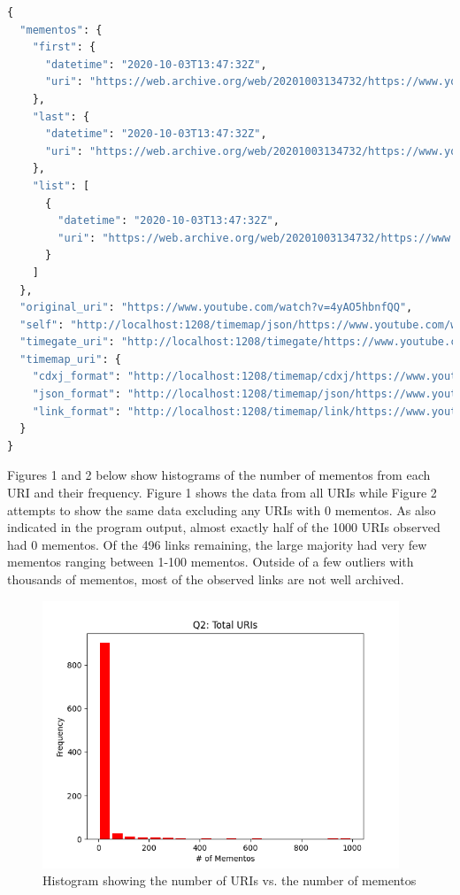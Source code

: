 \documentclass[12pt]{article}
\begin{document}
\begin{lstlisting}[language=Python, caption=TimeMap of first link, label=lst:copy]
{
  "mementos": {
    "first": {
      "datetime": "2020-10-03T13:47:32Z",
      "uri": "https://web.archive.org/web/20201003134732/https://www.youtube.com/watch?v=4yAO5hbnfQQ&gl=US&hl=en"
    },
    "last": {
      "datetime": "2020-10-03T13:47:32Z",
      "uri": "https://web.archive.org/web/20201003134732/https://www.youtube.com/watch?v=4yAO5hbnfQQ&gl=US&hl=en"
    },
    "list": [
      {
        "datetime": "2020-10-03T13:47:32Z",
        "uri": "https://web.archive.org/web/20201003134732/https://www.youtube.com/watch?v=4yAO5hbnfQQ&gl=US&hl=en"
      }
    ]
  },
  "original_uri": "https://www.youtube.com/watch?v=4yAO5hbnfQQ",
  "self": "http://localhost:1208/timemap/json/https://www.youtube.com/watch?v=4yAO5hbnfQQ",
  "timegate_uri": "http://localhost:1208/timegate/https://www.youtube.com/watch?v=4yAO5hbnfQQ",
  "timemap_uri": {
    "cdxj_format": "http://localhost:1208/timemap/cdxj/https://www.youtube.com/watch?v=4yAO5hbnfQQ",
    "json_format": "http://localhost:1208/timemap/json/https://www.youtube.com/watch?v=4yAO5hbnfQQ",
    "link_format": "http://localhost:1208/timemap/link/https://www.youtube.com/watch?v=4yAO5hbnfQQ"
  }
}
\end{lstlisting}


\par Figures 1 and 2 below show histograms of the number of mementos from each URI and their frequency. Figure 1 shows the data from all URIs while Figure 2 attempts to show the same data excluding any URIs with 0 mementos. As also indicated in the program output, almost exactly half of the 1000 URIs observed had 0 mementos. Of the 496 links remaining, the large majority had very few mementos ranging between 1-100 mementos. Outside of a few outliers with thousands of mementos, most of the observed links are not well archived.   

\begin{figure}[H]
            \centering
            \includegraphics[width=0.95\textwidth]{Final_Histo_All_Data.png}
            \caption{Histogram showing the number of URIs vs. the number of mementos}
            \label{fig:my_label}
        \end{figure}
\end{document}

